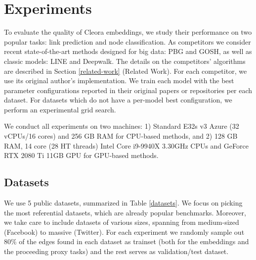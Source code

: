 \documentclass{IEEEtran}
\begin{document}
 
\section{Experiments}
To evaluate the quality of Cleora embeddings, we study their performance on two popular tasks: link prediction \cite{10.5555/1241540.1241551} and node classification. As competitors we consider recent state-of-the-art methods designed for big data: PBG and GOSH, as well as classic models: LINE and Deepwalk. The details on the competitors' algorithms are described in Section \ref{related-work} (Related Work). For each competitor, we use its original author's implementation. We train each model with the best parameter configurations reported in their original papers or repositories per each dataset. For datasets which do not have a per-model best configuration, we perform an experimental grid search.



We conduct all experiments on two machines: 1) Standard E32s v3 Azure  (32 vCPUs/16 cores) and 256 GB RAM for CPU-based methods, and 2) 128 GB RAM, 14 core (28 HT threads) Intel Core i9-9940X 3.30GHz CPUs and  GeForce RTX 2080 Ti 11GB GPU for GPU-based methods.

\subsection{Datasets}
We use 5 public datasets, summarized in Table \ref{datasets}. We focus on picking the most referential datasets, which are already popular benchmarks. Moreover, we take care to include datasets of various sizes, spanning from medium-sized (Facebook) to massive (Twitter). For each experiment we randomly sample out 80\% of the edges found in each dataset as trainset (both for the embeddings and the proceeding proxy tasks) and the rest serves as validation/test dataset.
\end{document}
